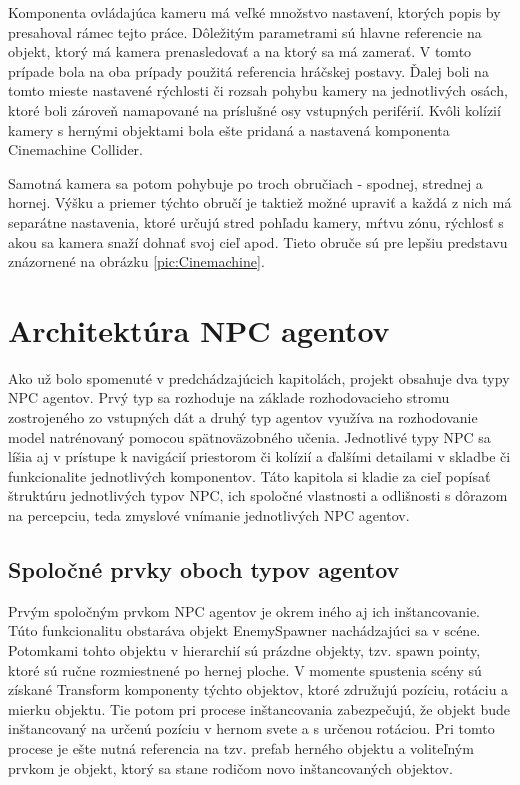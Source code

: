\documentclass[slovak, master]{diploma}
\begin{document}
Komponenta ovládajúca kameru má veľké množstvo nastavení, ktorých popis by presahoval rámec tejto práce. Dôležitým parametrami sú hlavne referencie na objekt, ktorý má kamera prenasledovať a na ktorý sa má zamerať. V tomto prípade bola na oba prípady použitá referencia hráčskej postavy. Ďalej boli na tomto mieste nastavené rýchlosti či rozsah pohybu kamery na jednotlivých osách, ktoré boli zároveň namapované na príslušné osy vstupných periférií. Kvôli kolízií kamery s hernými objektami bola ešte pridaná a nastavená komponenta Cinemachine Collider.

Samotná kamera sa potom pohybuje po troch obručiach - spodnej, strednej a hornej. Výšku a priemer týchto obručí je taktiež možné upraviť a každá z nich má separátne nastavenia, ktoré určujú stred pohľadu kamery, mŕtvu zónu, rýchlosť s akou sa kamera snaží dohnať svoj cieľ apod. Tieto obruče sú pre lepšiu predstavu znázornené na obrázku \ref{pic:Cinemachine}.

\chapter{Architektúra NPC agentov}
\label{sec:Agents}
Ako už bolo spomenuté v predchádzajúcich kapitolách, projekt obsahuje dva typy NPC agentov. Prvý typ sa rozhoduje na základe rozhodovacieho stromu zostrojeného zo vstupných dát a druhý typ agentov využíva na rozhodovanie model natrénovaný pomocou spätnoväzobného učenia. Jednotlivé typy NPC sa líšia aj v prístupe k navigácií priestorom či kolízií a ďalšími detailami v skladbe či funkcionalite jednotlivých komponentov. Táto kapitola si kladie za cieľ popísať štruktúru jednotlivých typov NPC, ich spoločné vlastnosti a odlišnosti s dôrazom na percepciu, teda zmyslové vnímanie jednotlivých NPC agentov.

\section{Spoločné prvky oboch typov agentov}
\label{sec:AgentsBoth}

Prvým spoločným prvkom NPC agentov je okrem iného aj ich inštancovanie. Túto funkcionalitu obstaráva objekt EnemySpawner nachádzajúci sa v scéne. Potomkami tohto objektu v hierarchií sú prázdne objekty, tzv. spawn pointy, ktoré sú ručne rozmiestnené po hernej ploche. V momente spustenia scény sú získané Transform komponenty týchto objektov, ktoré združujú pozíciu, rotáciu a mierku objektu. Tie potom pri procese inštancovania zabezpečujú, že objekt bude inštancovaný na určenú pozíciu v hernom svete a s určenou rotáciou. Pri tomto procese je ešte nutná referencia na tzv. prefab herného objektu a voliteľným prvkom je objekt, ktorý sa stane rodičom novo inštancovaných objektov. 
\end{document}
